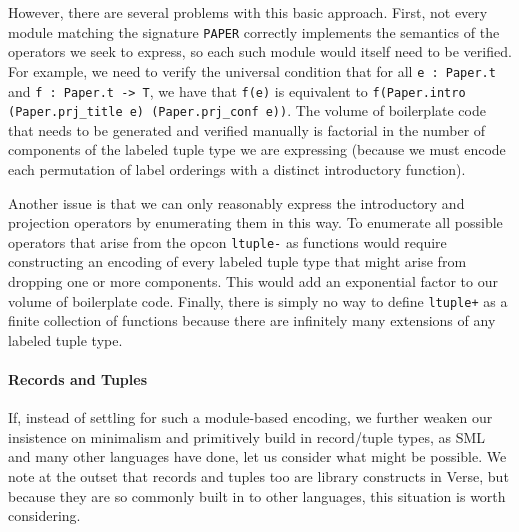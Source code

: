 However, there are several problems with this basic approach. First, not every module matching the signature \lstinline{PAPER} correctly implements the semantics of the operators we seek to express, so each such module would itself need to be verified. For example, we need to verify the universal condition that for all \lstinline{e : Paper.t} and \lstinline{f : Paper.t -> T}, we have that \lstinline{f(e)} is equivalent to \lstinline{f(Paper.intro (Paper.prj_title e) (Paper.prj_conf e))}. The volume of boilerplate code that needs to be generated and verified manually is factorial in the number of components of the labeled tuple type we are expressing (because we must encode each permutation of label orderings with a distinct introductory function).%

Another issue is that we can only reasonably express the introductory and projection operators by enumerating them in this way. To enumerate all possible operators that arise from the opcon \lstinline{ltuple-} as functions would require constructing an encoding of every labeled tuple type that might arise from dropping one or more components. This would add an  exponential factor to our volume of boilerplate code. 
Finally, there is simply no way to define \lstinline{ltuple+} as a finite collection of functions because there are infinitely many extensions of any labeled tuple type. %


\paragraph{Records and Tuples}
If, instead of settling for such a module-based encoding, we further weaken our insistence on minimalism and primitively build in record/tuple types, as SML and many other languages have done, let us consider what might be possible. We note at the outset that records and tuples too are library constructs in Verse, but because they are so commonly built in to other languages, this situation is worth considering.%

